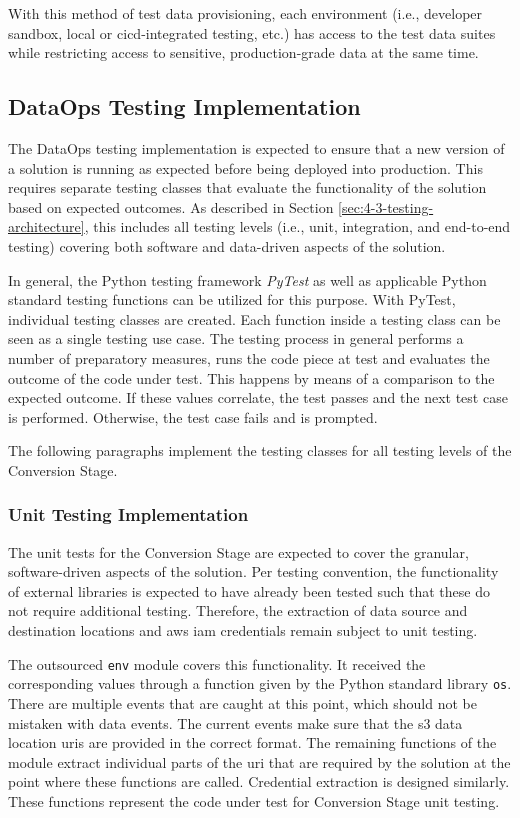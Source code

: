 With this method of test data provisioning, each environment (i.e., developer sandbox, local or \ac{cicd}-integrated testing, etc.) has access to the test data suites while restricting access to sensitive, production-grade data at the same time.

\subsection{DataOps Testing Implementation}
The DataOps testing implementation is expected to ensure that a new version of a solution is running as expected before being deployed into production. This requires separate testing classes that evaluate the functionality of the solution based on expected outcomes. As described in Section \ref{sec:4-3-testing-architecture}, this includes all testing levels (i.e., unit, integration, and end-to-end testing) covering both software and data-driven aspects of the solution. 

In general, the Python testing framework \textit{PyTest} as well as applicable Python standard testing functions can be utilized for this purpose. With PyTest, individual testing classes are created. Each function inside a testing class can be seen as a single testing use case. The testing process in general performs a number of preparatory measures, runs the code piece at test and evaluates the outcome of the code under test. This happens by means of a comparison to the expected outcome. If these values correlate, the test passes and the next test case is performed. Otherwise, the test case fails and is prompted.

The following paragraphs implement the testing classes for all testing levels of the Conversion Stage.

\subsubsection{Unit Testing Implementation}
The unit tests for the Conversion Stage are expected to cover the granular, software-driven aspects of the solution. Per testing convention, the functionality of external libraries is expected to have already been tested such that these do not require additional testing. Therefore, the extraction of data source and destination locations and \ac{aws} \ac{iam} credentials remain subject to unit testing.

The outsourced \texttt{env} module covers this functionality. It received the corresponding values through a function given by the Python standard library \texttt{os}. There are multiple events that are caught at this point, which should not be mistaken with data events. The current events make sure that the \ac{s3} data location \acp{uri} are provided in the correct format. The remaining functions of the module extract individual parts of the \ac{uri} that are required by the solution at the point where these functions are called. Credential extraction is designed similarly. These functions represent the code under test for Conversion Stage unit testing.

